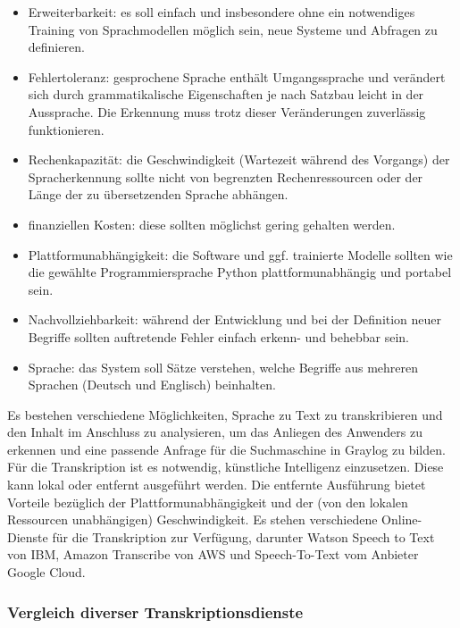 \begin{itemize}
\item Erweiterbarkeit: es soll einfach und insbesondere ohne ein notwendiges Training von Sprachmodellen möglich sein, neue Systeme und Abfragen zu definieren.
\item Fehlertoleranz: gesprochene Sprache enthält Umgangssprache und verändert sich durch grammatikalische Eigenschaften je nach Satzbau leicht in der Aussprache. Die Erkennung muss trotz dieser Veränderungen zuverlässig funktionieren.
\item Rechenkapazität: die Geschwindigkeit (Wartezeit während des Vorgangs) der Spracherkennung sollte nicht von begrenzten Rechenressourcen oder der Länge der zu übersetzenden Sprache abhängen.
\item finanziellen Kosten: diese sollten möglichst gering gehalten werden.
\item Plattformunabhängigkeit: die Software und ggf. trainierte Modelle sollten wie die gewählte Programmiersprache Python plattformunabhängig und portabel sein.
\item Nachvollziehbarkeit: während der Entwicklung und bei der Definition neuer Begriffe sollten auftretende Fehler einfach erkenn- und behebbar sein.
\item Sprache: das System soll Sätze verstehen, welche Begriffe aus mehreren Sprachen (Deutsch und Englisch) beinhalten.
\end{itemize}

Es bestehen verschiedene Möglichkeiten, Sprache zu Text zu transkribieren und den Inhalt im Anschluss zu analysieren, um das Anliegen des Anwenders zu erkennen und eine passende Anfrage für die Suchmaschine in Graylog zu bilden. Für die Transkription ist es notwendig, künstliche Intelligenz einzusetzen. Diese kann lokal oder entfernt ausgeführt werden. Die entfernte Ausführung bietet Vorteile bezüglich der Plattformunabhängigkeit und der (von den lokalen Ressourcen unabhängigen) Geschwindigkeit. Es stehen verschiedene Online-Dienste für die Transkription zur Verfügung, darunter Watson Speech to Text von IBM, Amazon Transcribe von AWS und Speech-To-Text vom Anbieter Google Cloud. 

\subsubsection{Vergleich diverser Transkriptionsdienste}
\label{sec:vergleich-transkrip}

